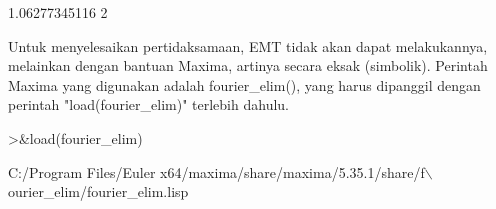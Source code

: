 \documentclass[a4paper,10pt]{article}
\begin{document}
\begin{eulernotebook}
\begin{eulercomment}
\begin{eulercomment}
\begin{eulercomment}
\begin{eulercomment}
\begin{eulercomment}
\begin{eulercomment}
\begin{eulercomment}
\begin{eulercomment}
\begin{eulerprompt}
\end{eulerprompt}
\begin{euleroutput}
  1.06277345116
  2
\end{euleroutput}
\begin{eulercomment}
Untuk menyelesaikan pertidaksamaan, EMT tidak akan dapat melakukannya,
melainkan dengan bantuan Maxima, artinya secara eksak (simbolik).
Perintah Maxima yang digunakan adalah fourier\_elim(), yang harus
dipanggil dengan perintah "load(fourier\_elim)" terlebih dahulu.
\end{eulercomment}
\begin{eulerprompt}
>&load(fourier_elim)
\end{eulerprompt}
\begin{euleroutput}
  
          C:/Program Files/Euler x64/maxima/share/maxima/5.35.1/share/f\(\backslash\)
  ourier_elim/fourier_elim.lisp
  

\end{euleroutput}
\end{eulercomment}
\end{eulercomment}
\end{eulercomment}
\end{eulercomment}
\end{eulercomment}
\end{eulercomment}
\end{eulercomment}
\end{eulercomment}
\end{eulernotebook}
\end{document}
